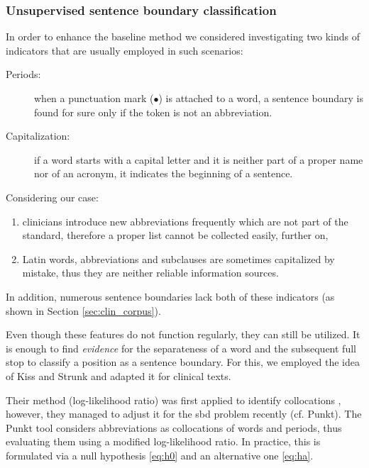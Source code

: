 \subsubsection{Unsupervised sentence boundary classification}

In order to enhance the baseline method we considered investigating two kinds of indicators that are usually employed in such scenarios:
\begin{description}
 \item[Periods:] when a punctuation mark ($\bullet$) is attached to a word, a sentence boundary is found for sure only if the token is not an abbreviation.
 \item[Capitalization:] if a word starts with a capital letter and it is neither part of a proper name nor of an acronym, it indicates the beginning of a sentence.
\end{description}
Considering our case:
\begin{enumerate}
\item clinicians introduce new abbreviations frequently which are not part of the standard, therefore a proper list cannot be collected easily, further on, 
\item Latin words, abbreviations and subclauses are sometimes capitalized by mistake, thus they are neither reliable information sources.
\end{enumerate}
In addition, numerous sentence boundaries lack both of these indicators (as shown in Section \ref{sec:clin_corpus}). %

Even though these features do not function regularly, they can still be utilized.  %
It is enough to find \emph{evidence} for the separateness of a word and the subsequent full stop to classify a position as a sentence boundary. 
For this, we employed the idea of Kiss and Strunk \cite{kiss2006unsupervised} and adapted it for clinical texts.

Their method (log-likelihood ratio) was first applied to identify collocations \cite{dunning1993accurate}, however, they managed to adjust it for the \acrshort{sbd} problem recently (cf. Punkt\cite{kiss2006unsupervised}). 
The Punkt tool considers abbreviations as collocations of words and periods, thus evaluating them using a modified log-likelihood ratio.
In practice, this is formulated via a null hypothesis \eqref{eq:h0} and an alternative one \eqref{eq:ha}. 

